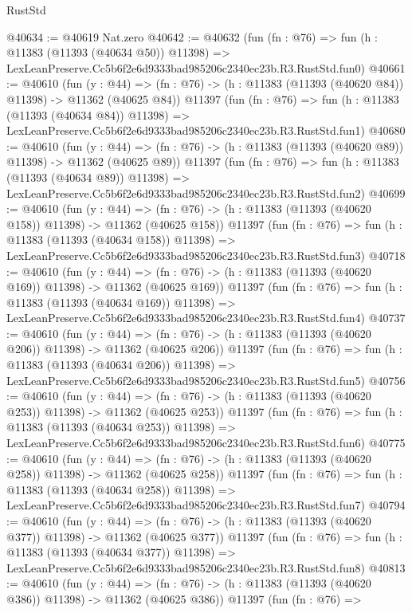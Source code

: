 \begin{lexlean}{RustStd}
\begin{coremodule}
@40634 := @40619 Nat.zero
@40642 := @40632
    (fun (fn : @76) =>
    fun (h : @11383 (@11393 (@40634 @50)) @11398) =>
    LexLeanPreserve.Cc5b6f2e6d9333bad985206c2340ec23b.R3.RustStd.fun0)
@40661 := @40610
    (fun (y : @44) =>
    (fn : @76) -> (h : @11383 (@11393 (@40620 @84)) @11398) -> @11362 (@40625 @84))
    @11397
    (fun (fn : @76) =>
    fun (h : @11383 (@11393 (@40634 @84)) @11398) =>
    LexLeanPreserve.Cc5b6f2e6d9333bad985206c2340ec23b.R3.RustStd.fun1)
@40680 := @40610
    (fun (y : @44) =>
    (fn : @76) -> (h : @11383 (@11393 (@40620 @89)) @11398) -> @11362 (@40625 @89))
    @11397
    (fun (fn : @76) =>
    fun (h : @11383 (@11393 (@40634 @89)) @11398) =>
    LexLeanPreserve.Cc5b6f2e6d9333bad985206c2340ec23b.R3.RustStd.fun2)
@40699 := @40610
    (fun (y : @44) =>
    (fn : @76) -> (h : @11383 (@11393 (@40620 @158)) @11398) -> @11362 (@40625 @158))
    @11397
    (fun (fn : @76) =>
    fun (h : @11383 (@11393 (@40634 @158)) @11398) =>
    LexLeanPreserve.Cc5b6f2e6d9333bad985206c2340ec23b.R3.RustStd.fun3)
@40718 := @40610
    (fun (y : @44) =>
    (fn : @76) -> (h : @11383 (@11393 (@40620 @169)) @11398) -> @11362 (@40625 @169))
    @11397
    (fun (fn : @76) =>
    fun (h : @11383 (@11393 (@40634 @169)) @11398) =>
    LexLeanPreserve.Cc5b6f2e6d9333bad985206c2340ec23b.R3.RustStd.fun4)
@40737 := @40610
    (fun (y : @44) =>
    (fn : @76) -> (h : @11383 (@11393 (@40620 @206)) @11398) -> @11362 (@40625 @206))
    @11397
    (fun (fn : @76) =>
    fun (h : @11383 (@11393 (@40634 @206)) @11398) =>
    LexLeanPreserve.Cc5b6f2e6d9333bad985206c2340ec23b.R3.RustStd.fun5)
@40756 := @40610
    (fun (y : @44) =>
    (fn : @76) -> (h : @11383 (@11393 (@40620 @253)) @11398) -> @11362 (@40625 @253))
    @11397
    (fun (fn : @76) =>
    fun (h : @11383 (@11393 (@40634 @253)) @11398) =>
    LexLeanPreserve.Cc5b6f2e6d9333bad985206c2340ec23b.R3.RustStd.fun6)
@40775 := @40610
    (fun (y : @44) =>
    (fn : @76) -> (h : @11383 (@11393 (@40620 @258)) @11398) -> @11362 (@40625 @258))
    @11397
    (fun (fn : @76) =>
    fun (h : @11383 (@11393 (@40634 @258)) @11398) =>
    LexLeanPreserve.Cc5b6f2e6d9333bad985206c2340ec23b.R3.RustStd.fun7)
@40794 := @40610
    (fun (y : @44) =>
    (fn : @76) -> (h : @11383 (@11393 (@40620 @377)) @11398) -> @11362 (@40625 @377))
    @11397
    (fun (fn : @76) =>
    fun (h : @11383 (@11393 (@40634 @377)) @11398) =>
    LexLeanPreserve.Cc5b6f2e6d9333bad985206c2340ec23b.R3.RustStd.fun8)
@40813 := @40610
    (fun (y : @44) =>
    (fn : @76) -> (h : @11383 (@11393 (@40620 @386)) @11398) -> @11362 (@40625 @386))
    @11397
    (fun (fn : @76) =>

\end{coremodule}
\end{lexlean}
